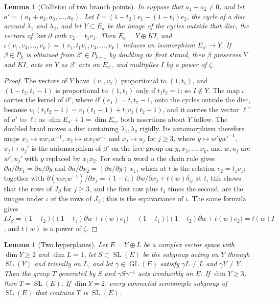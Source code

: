 \documentclass[11pt,reqno]{amsart}
\theoremstyle{plain}
\newtheorem{lemma}[theorem]{Lemma}
\theoremstyle{definition}
\theoremstyle{remark}
\DeclareMathOperator{\GL}{GL}
\DeclareMathOperator{\SL}{SL}
\begin{document}
\begin{lemma}[Collision of two branch points]\label{lem:cabling}
In  suppose that $a_{1}+a_{2}\ne0$, and let
$a'=(a_{1}+a_{2},a_{3},\dots,a_{k})$. Let $I=(1-t_{2})e_{1}-(1-t_{1})e_{2}$,
the cycle of a disc around $\lambda_{1}$ and $\lambda_{2}$, and let
$Y\subset E_{a}$ be the image of the cycles outside that disc, the vectors of
$\ker\partial$ with $v_{2}=t_{1}v_{1}$. Then $E_{a}=Y\oplus KI$, and
$\iota(v_{1},v_{3},\dots,v_{k})=(v_{1},t_{1}v_{1},v_{3},\dots,v_{k})$ induces an
isomorphism $E_{a'}\to Y$. If $\beta\in P_{k}$ is obtained from
$\beta'\in P_{k-1}$ by doubling its first strand, then $\beta$ preserves $Y$
and $KI$, acts on $Y$ as $\beta'$ acts on $E_{a'}$, and multiplies $I$ by a
power of $\zeta$.
\end{lemma}

\begin{proof}
The vectors of $Y$ have $(v_{1},v_{2})$ proportional to $(1,t_{1})$, and
$(1-t_{2},t_{1}-1)$ is proportional to $(1,t_{1})$ only if $t_{1}t_{2}=1$; so
$I\notin Y$. The map $\iota$ carries the kernel of $\partial'$, where
$\partial'(e_{1})=t_{1}t_{2}-1$, onto the cycles outside the disc, because
$v_{1}(t_{1}t_{2}-1)=v_{1}(t_{1}-1)+t_{1}v_{1}(t_{2}-1)$, and it carries the
vector $\ell'$ of $a'$ to $\ell$; as $\dim E_{a'}+1=\dim E_{a}$, both
assertions about $Y$ follow. The doubled braid moves a disc containing
$\lambda_{1},\lambda_{2}$ rigidly. Its automorphism therefore maps
$x_{1}\mapsto wx_{1}w^{-1}$, $x_{2}\mapsto wx_{2}w^{-1}$ and $x_{j}\mapsto
u_{j}$ for $j\ge3$, where $y\mapsto w'yw'^{-1}$, $x_{j}\mapsto u_{j}'$ is the
automorphism of $\beta'$ on the free group on $y,x_{3},\dots,x_{k}$, and
$w,u_{j}$ are $w',u_{j}'$ with $y$ replaced by $x_{1}x_{2}$. For such a word
$u$ the chain rule gives $\partial u/\partial x_{1}=\partial u/\partial y$
and $\partial u/\partial x_{2}=(\partial u/\partial y)\,x_{1}$, which at $t$ is
the relation $v_{2}=t_{1}v_{1}$; together with
$\partial(wx_{i}w^{-1})/\partial x_{j}=(1-t_{i})\,\partial w/\partial
x_{j}+t(w)\delta_{ij}$ at $t$, this shows that the rows of $J_{\beta}$ for
$j\ge3$, and the first row plus $t_{1}$ times the second, are the images under
$\iota$ of the rows of $J_{\beta'}$; this is the equivariance of $\iota$. The
same formula gives $IJ_{\beta}=(1-t_{2})\bigl((1-t_{1})\partial w+t(w)e_{1}\bigr)
-(1-t_{1})\bigl((1-t_{2})\partial w+t(w)e_{2}\bigr)=t(w)I$, and $t(w)$ is a
power of $\zeta$.
\end{proof}

\begin{lemma}[Two hyperplanes]\label{lem:hyperplanes}
Let $E=Y\oplus L$ be a complex vector space with $\dim Y\ge2$ and
$\dim L=1$, let $S\subset\SL(E)$ be the subgroup acting on $Y$ through
$\SL(Y)$ and trivially on $L$, and let $\gamma\in\GL(E)$ satisfy
$\gamma L\ne L$ and $\gamma Y\ne Y$. Then the group $T$ generated by $S$ and
$\gamma S\gamma^{-1}$ acts irreducibly on $E$. If $\dim Y\ge3$, then
$T=\SL(E)$. If $\dim Y=2$, every connected semisimple subgroup of $\SL(E)$
that contains $T$ is $\SL(E)$.
\end{lemma}
\end{document}
